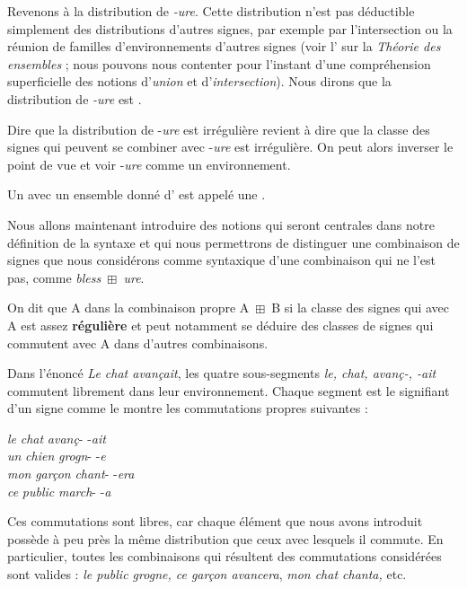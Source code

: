 Revenons à la distribution de \textit{{}-ure}. Cette distribution n’est pas déductible simplement des distributions d’autres signes, par exemple par l’intersection ou la réunion de familles d’environnements d’autres signes (voir l’ sur la \textit{Théorie des ensembles} ; nous pouvons nous contenter pour l’instant d’une compréhension superficielle des notions d'\textit{union} et d'\textit{intersection}). Nous dirons que la distribution de  \textit{{}-ure} est .

Dire que la distribution de -\textit{ure} est irrégulière revient à dire que la classe des signes qui peuvent se combiner avec -\textit{ure} est irrégulière.
On peut alors inverser le point de vue et voir -\textit{ure} comme un environnement.

{Un  avec un ensemble donné d’ est appelé une .}

Nous allons maintenant introduire des notions qui seront centrales dans notre définition de la syntaxe et qui nous permettrons de distinguer une combinaison de signes que nous considérons comme syntaxique d'une combinaison qui ne l'est pas, comme \textit{bless~}${\boxplus}$\textit{~ure}.

{On dit que A  dans la combinaison propre A~${\boxplus}$~B si la classe des signes qui  avec A est assez \textbf{régulière} et peut notamment se déduire des classes de signes qui commutent avec A dans d’autres combinaisons.}

Dans l’énoncé \textit{Le chat avançait}, les quatre sous-segments \textit{le, chat, avanç-, -ait} commutent librement dans leur environnement. Chaque segment est le signifiant d’un signe comme le montre les commutations propres suivantes :

\ea\gllll  \textit{le}   \textit{chat}   \textit{avanç}-   -\textit{ait}\\
 \textit{un}   \textit{chien}   \textit{grogn}-   -\textit{e}\\
 \textit{mon}   \textit{garçon}   \textit{chant}-   -\textit{era}\\
 \textit{ce}   \textit{public}   \textit{march}-   -\textit{a}\\
\z

Ces commutations sont libres, car chaque élément que nous avons introduit possède à peu près la même distribution que ceux avec lesquels il commute. En particulier, toutes les combinaisons qui résultent des commutations considérées sont valides : \textit{le public grogne, ce garçon avancera}, \textit{mon chat chanta,} etc.

